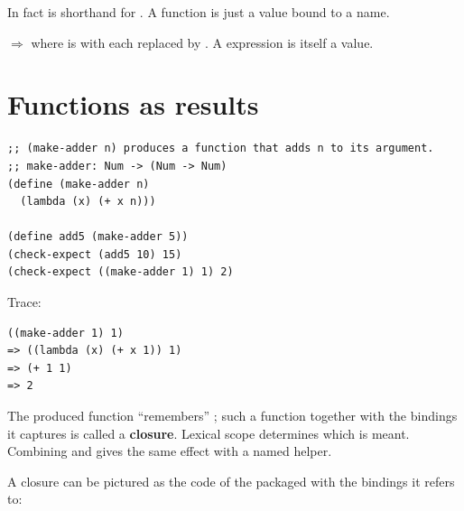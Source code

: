 In fact  is shorthand for
. A function is just a value bound to a
name.

\begin{important}
 $\Rightarrow$  where
 is  with each  replaced by . A
 expression is itself a value.
\end{important}

\section{Functions as results}
\begin{lstlisting}[style=racket]
;; (make-adder n) produces a function that adds n to its argument.
;; make-adder: Num -> (Num -> Num)
(define (make-adder n)
  (lambda (x) (+ x n)))

(define add5 (make-adder 5))
(check-expect (add5 10) 15)
(check-expect ((make-adder 1) 1) 2)
\end{lstlisting}
Trace:
\begin{lstlisting}[style=racket]
((make-adder 1) 1)
=> ((lambda (x) (+ x 1)) 1)
=> (+ 1 1)
=> 2
\end{lstlisting}
The produced function ``remembers'' ; such a function together with the
bindings it captures is called a \textbf{closure}. Lexical scope determines
which  is meant. Combining  and  gives the same
effect with a named helper.

A closure can be pictured as the code of the  packaged with the
bindings it refers to:

\begin{center}
\end{center}

